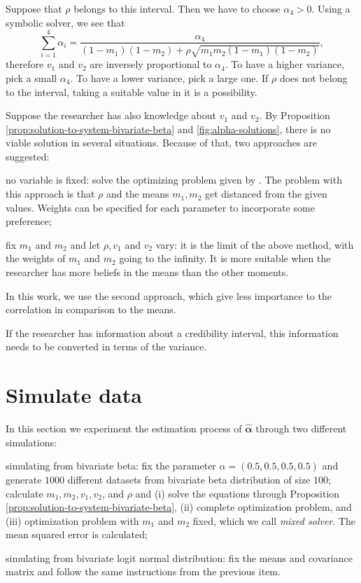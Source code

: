 Suppose that $\rho$ belongs to this interval. Then we have to choose $\alpha_4
> 0$. Using a symbolic solver, we see that 
$$
\sum_{i=1}^4 \alpha_i = \frac{\alpha_4}{(1-m_1)(1-m_2) + \rho\sqrt{m_1m_2(1-m_1)(1-m_2)}}, 
$$
therefore $v_1$ and $v_2$ are inversely proportional to $\alpha_4$. To have a
higher variance, pick a small $\alpha_4$. To have a lower variance, pick a
large one. If $\rho$ does not belong to the interval, taking a suitable value
in it is a possibility. 

Suppose the researcher has also knowledge about $v_1$ and $v_2$. By
Proposition \ref{prop:solution-to-system-bivariate-beta} and
\autoref{fig:alpha-solutions}, there is no viable
solution in several situations. Because of that, two approaches are suggested:

\begin{alineas}
  \item no variable is fixed: solve the optimizing problem given by 
  \textcite[p. 7]{olkin2015constructions}. The problem with this approach is 
  that $\rho$ and the means $m_1, m_2$ get distanced from the given values.
  Weights can be specified for each parameter to incorporate some preference;  
  \item fix $m_1$ and $m_2$ and let $\rho, v_1$ and $v_2$ vary: it is the
  limit of the above method, with the weights of $m_1$ and $m_2$ going to the
  infinity. It is more suitable when the researcher has more beliefs in the
  means than the other moments. 
\end{alineas}

In this work, we use the second approach, which give less importance to the
correlation in comparison to the means. 

\begin{remark}
  If the researcher has information about a credibility interval, this
  information needs to be converted in terms of the variance.
\end{remark}

\section{Simulate data}

In this section we experiment the estimation process of $\hat{\boldsymbol{\alpha}}$ through
two different simulations: 

\begin{alineas}
  \item simulating from bivariate beta: fix the parameter $\alpha = (0.5, 0.5,
  0.5, 0.5)$ and generate $1000$
  different datasets from bivariate beta distribution of size $100$; calculate
  $m_1, m_2, v_1, v_2$, and $\rho$ and (i) solve the equations through Proposition
  \eqref{prop:solution-to-system-bivariate-beta}, (ii) complete optimization
  problem, and (iii) optimization problem with $m_1$ and $m_2$ fixed, which we
  call {\em mixed solver}. The mean squared error is calculated;
  \item simulating from bivariate logit normal distribution: fix the means and
  covariance matrix and follow the same instructions from the previous item.
\end{alineas}

